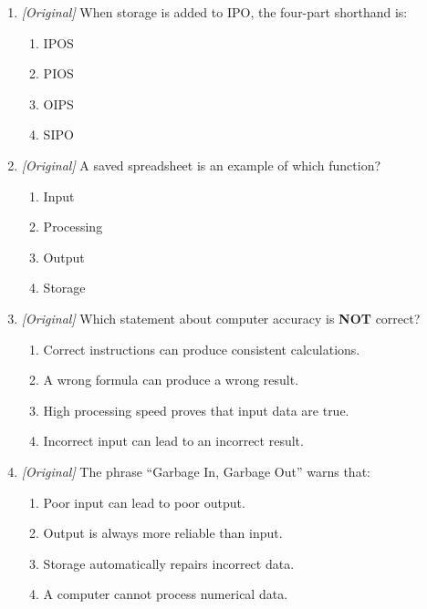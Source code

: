 \begin{enumerate}[label=\textbf{Q\arabic*.}, leftmargin=*]
  order?
  \begin{enumerate}[label=\Alph*.]
    \item Output, input, processing
    \item Input, processing, output
    \item Processing, output, input
    \item Storage, input, output
  \end{enumerate}
\item \textit{[Original]} When storage is added to IPO, the four-part
  shorthand is:
  \begin{enumerate}[label=\Alph*.]
    \item IPOS
    \item PIOS
    \item OIPS
    \item SIPO
  \end{enumerate}
\item \textit{[Original]} A saved spreadsheet is an example of which
  function?
  \begin{enumerate}[label=\Alph*.]
    \item Input
    \item Processing
    \item Output
    \item Storage
  \end{enumerate}
\item \textit{[Original]} Which statement about computer accuracy is
  \textbf{NOT} correct?
  \begin{enumerate}[label=\Alph*.]
    \item Correct instructions can produce consistent calculations.
    \item A wrong formula can produce a wrong result.
    \item High processing speed proves that input data are true.
    \item Incorrect input can lead to an incorrect result.
  \end{enumerate}
\item \textit{[Original]} The phrase ``Garbage In, Garbage Out'' warns that:
  \begin{enumerate}[label=\Alph*.]
    \item Poor input can lead to poor output.
    \item Output is always more reliable than input.
    \item Storage automatically repairs incorrect data.
    \item A computer cannot process numerical data.

\end{enumerate}
\end{enumerate}
